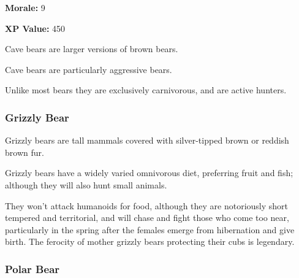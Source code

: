 \begin{multicols*}{2}
{\textbf{Morale:} 9

\textbf{XP Value:} 450}

Cave bears are larger versions of brown bears.

Cave bears are particularly aggressive bears.

Unlike most bears they are exclusively carnivorous, and are active hunters.

\subsubsection{Grizzly Bear}

Grizzly bears are tall mammals covered with silver-tipped brown or reddish brown fur.

Grizzly bears have a widely varied omnivorous diet, preferring fruit and fish; although they will also hunt small animals.

They won’t attack humanoids for food, although they are notoriously short tempered and territorial, and will chase and fight those who come too near, particularly in the spring after the females emerge from hibernation and give birth. The ferocity of mother grizzly bears protecting their cubs is legendary.

\subsubsection{Polar Bear}
\end{multicols*}
